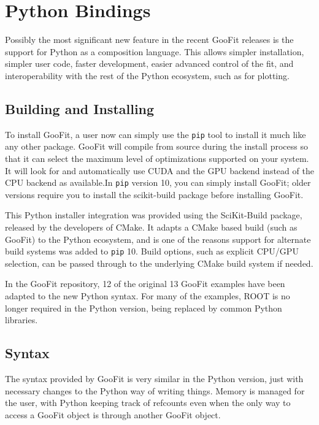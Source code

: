\documentclass{webofc}
\begin{document}
\section{Python Bindings}
\label{sec-py}

Possibly the most significant new feature in the recent GooFit releases is the support for Python as a composition language. This allows simpler installation, simpler user code, faster development, easier advanced control of the fit, and interoperability with the rest of the Python ecosystem, such as for plotting.

\subsection{Building and Installing}

To install GooFit, a user now can simply use the \texttt{pip} tool to install it much like any other package. GooFit will compile from source during the install process so that it can select the maximum level of optimizations supported on your system. It will look for and automatically use CUDA and the GPU backend instead of the CPU backend as available.In \texttt{pip} version 10, you can simply install GooFit; older versions require you to install the scikit-build  package before installing GooFit.

This Python installer integration was provided using the SciKit-Build package, released by the developers of CMake. It adapts a CMake based build (such as GooFit) to the Python ecosystem, and is one of the reasons support for alternate build systems was added to \texttt{pip} 10. Build options, such as explicit CPU/GPU selection, can be passed through to the underlying CMake build system if needed.

In the GooFit repository, 12 of the original 13 GooFit examples have been  adapted to the new Python syntax. For many of the examples, ROOT is no longer required in the Python version, being replaced by common Python libraries.

\subsection{Syntax}

The syntax provided by GooFit is very similar in the Python version, just with necessary changes to the Python way of writing things. Memory is managed for the user, with Python keeping track of refcounts even when the only way to access a GooFit object is through another GooFit object.
\end{document}
